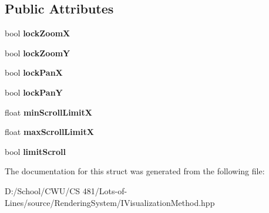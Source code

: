 \subsection*{Public Attributes}
\begin{DoxyCompactItemize}
\item 
bool {\bfseries lock\+ZoomX}\hypertarget{struct_lots_of_lines_1_1_navigation_options_a81c6b99a7927e7cb34492e181b2e31bf}{}\label{struct_lots_of_lines_1_1_navigation_options_a81c6b99a7927e7cb34492e181b2e31bf}

\item 
bool {\bfseries lock\+ZoomY}\hypertarget{struct_lots_of_lines_1_1_navigation_options_ae5123c5fadd7477673249cc4d69931cd}{}\label{struct_lots_of_lines_1_1_navigation_options_ae5123c5fadd7477673249cc4d69931cd}

\item 
bool {\bfseries lock\+PanX}\hypertarget{struct_lots_of_lines_1_1_navigation_options_a7c0c9e7a00a30b7b251b87798464485e}{}\label{struct_lots_of_lines_1_1_navigation_options_a7c0c9e7a00a30b7b251b87798464485e}

\item 
bool {\bfseries lock\+PanY}\hypertarget{struct_lots_of_lines_1_1_navigation_options_a90c0cca6a2f504a5400fd04fc3b812b0}{}\label{struct_lots_of_lines_1_1_navigation_options_a90c0cca6a2f504a5400fd04fc3b812b0}

\item 
float {\bfseries min\+Scroll\+LimitX}\hypertarget{struct_lots_of_lines_1_1_navigation_options_ade7f6110db3e067a05f25c58e12758c3}{}\label{struct_lots_of_lines_1_1_navigation_options_ade7f6110db3e067a05f25c58e12758c3}

\item 
float {\bfseries max\+Scroll\+LimitX}\hypertarget{struct_lots_of_lines_1_1_navigation_options_ae357f841cbbae961c81e73c29dc4af46}{}\label{struct_lots_of_lines_1_1_navigation_options_ae357f841cbbae961c81e73c29dc4af46}

\item 
bool {\bfseries limit\+Scroll}\hypertarget{struct_lots_of_lines_1_1_navigation_options_a44171e4497aa78ae405705ae49505e04}{}\label{struct_lots_of_lines_1_1_navigation_options_a44171e4497aa78ae405705ae49505e04}

\end{DoxyCompactItemize}


The documentation for this struct was generated from the following file\+:\begin{DoxyCompactItemize}
\item 
D\+:/\+School/\+C\+W\+U/\+C\+S 481/\+Lots-\/of-\/\+Lines/source/\+Rendering\+System/I\+Visualization\+Method.\+hpp\end{DoxyCompactItemize}
